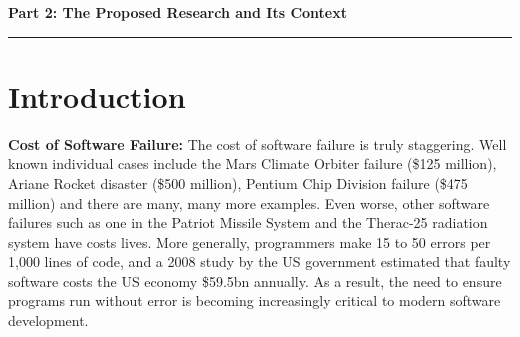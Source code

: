 \documentclass[a4paper,11pt]{article}
\begin{document}
\newpage

\noindent
{\bf \Large Part 2: The Proposed Research and Its Context}

\vspace*{-0.23in}

\begin{center}
\rule{170mm}{.5mm}
\end{center}

\vspace*{-0.3in}

\section{Introduction}\label{sec:intro}

\vspace*{-0.1in} 

{\bf Cost of Software Failure:} The cost of software failure is truly
staggering. Well known individual cases include the Mars Climate
Orbiter failure (\$125 million), Ariane Rocket disaster (\$500
million), Pentium Chip Division failure (\$475 million) and there are
many, many more examples. Even worse, other software failures such as
one in the Patriot Missile System and the Therac-25 radiation system
have costs lives. More generally, programmers make 15 to 50 errors per
1,000 lines of code, and a 2008 study by the US government estimated
that faulty software costs the US economy \$59.5bn annually.  As a
result, the need to ensure programs run without error is becoming
increasingly critical to modern software development.

\end{document}
